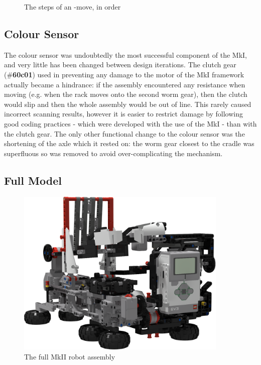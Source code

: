 \documentclass{report}
\newcommand{\tbo}[1]{\textbf{#1}}
\newcommand{\legopiece}[1]{(\#\tbo{#1})}
\newcommand{\move}[1]{\uppercase{\texttt{\formatmovesnospace{#1}}}-move}
\begin{document}
\begin{figure}[H]
\begin{subfigure}[b]{0.25\textwidth}
    		\caption{}
    		\label{fig:rdrXMoveArmRaised}
    	\end{subfigure}
    	\caption{The steps of an \move{x}, in order}
    	\label{fig:rdrXMoveRenders}
    \end{figure}
    
    
    \subsection{Colour Sensor}
    
    The colour sensor was undoubtedly the most successful component of the MkI, and very little has been changed between design iterations. The clutch gear \legopiece{60c01} used in preventing any damage to the motor of the MkI framework actually became a hindrance: if the assembly encountered any resistance when moving (e.g. when the rack moves onto the second worm gear), then the clutch would slip and then the whole assembly would be out of line. This rarely caused incorrect scanning results, however it is easier to restrict damage by following good coding practices - which were developed with the use of the MkI - than with the clutch gear. The only other functional change to the colour sensor was the shortening of the axle which it rested on: the worm gear closest to the cradle was superfluous so was removed to avoid over-complicating the mechanism.
    
    \subsection{Full Model}
    
   	\begin{figure}[H]
    	\begin{center}
    		\includegraphics[width=0.9\textwidth]{Resources/Images/rdrMkIIFull.png}
    		\caption{The full MkII robot assembly}
    		\label{fig:rdrMkIIFull}
    	\end{center} 
    \end{figure}
    
\end{document}
